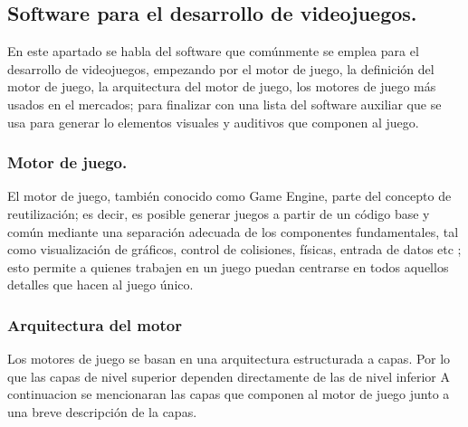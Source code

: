 \subsection{Software para el desarrollo de videojuegos.}\label{SoftVideojue}
En este apartado se habla del software que comúnmente se emplea para el desarrollo
 de videojuegos, empezando por el motor de juego, la definición del motor de juego, 
 la arquitectura del motor de juego, los motores de juego más usados en el 
 mercados; para finalizar con una lista del software auxiliar que se usa para 
 generar lo elementos visuales y auditivos que componen al juego.

 
\subsubsection{Motor de juego.}
El motor de juego, también conocido como Game Engine, parte del concepto de
 reutilización; es decir, es posible generar juegos a partir de un código base 
 y común mediante una separación adecuada de los componentes fundamentales, 
 tal como visualización de gráficos, control de colisiones, físicas, entrada de 
 datos etc \cite{Ref:MutorGraf}; esto permite a quienes trabajen en un juego 
 puedan centrarse en todos aquellos detalles que hacen al juego único.


\subsubsection{Arquitectura del motor}
Los motores de juego se basan en una arquitectura estructurada a capas. Por lo 
que las capas de nivel superior dependen directamente de las de nivel inferior
 \cite{Ref:ArquMotor} A continuacion se mencionaran las capas que componen al 
 motor de juego junto a una breve descripción de la capas.
 

